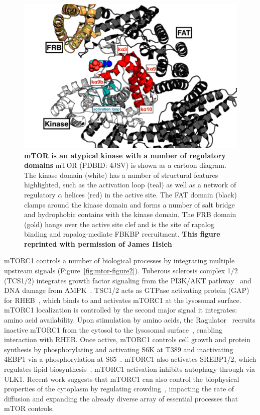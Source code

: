 \documentclass[phd,tocprelim]{cornell}
\begin{document}
\begin{landscape}
	\begin{figure}[p]
		\centering
		\includegraphics[width=0.8\linewidth]{figures/mtor-fig1.pdf}
		\caption[mTOR is an atypical kinase with a number of regulatory domains]{
			{\bf mTOR is an atypical kinase with a number of regulatory domains}
			mTOR (PDBID: 4JSV) is shown as a cartoon diagram. The kinase domain (white) has a number of structural features highlighted, such as the activation loop (teal) as well as a network of regulatory $\alpha$ helices (red) in the active site. The FAT domain (black) clamps around the kinase domain and forms a number of salt bridge and hydrophobic contains with the kinase domain. The FRB domain (gold) hangs over the active site clef and is the site of rapalog binding and rapalog-mediate FBKBP recruitment. \bf{This figure reprinted with permission of James Hsieh}
		}
		\label{fig:mtor-figure1}
	\end{figure}
\end{landscape}

mTORC1 controls a number of biological processes by integrating multiple upstream signals (Figure~\ref{fig:mtor-figure2}). Tuberous sclerosis complex 1/2 (TCS1/2) integrates growth factor signaling from the PI3K/AKT pathway~\citep{Inoki:2002jv,Manning:2002tp} and DNA damage from AMPK~\citep{Jones:2005kg}. TSC1/2 acts as GTPase activating protein (GAP) for RHEB~\citep{Inoki:2003je}, which binds to and activates mTORC1 at the lysosomal surface. mTORC1 localization is controlled by the second major signal it integrates: amino acid availability. Upon stimulation by amino acids, the Ragulator~\citep{BarPeled:2012fr} recruits inactive mTORC1 from the cytosol to the lysosomal surface~\citep{Kim:2008kb,Sancak:2010bu,Efeyan:2012de}, enabling interaction with RHEB. Once active, mTORC1 controls cell growth and protein synthesis by phosphorylating and activating S6K at T389 and inactivating 4EBP1 via a phosphorylation at S65~\citep{Hay:2004ir,Laplante:2012fm}. mTORC1 also activates SREBP1/2, which regulates lipid biosynthesis~\citep{Lamming:2013dza}. mTORC1 activation inhibits autophagy through via ULK1. Recent work suggests that mTORC1 can also control the biophysical properties of the cytoplasm by regulating crowding~\citep{Delarue:2018ca}, impacting the rate of diffusion and expanding the already diverse array of essential processes that mTOR controls. 
\end{document}
